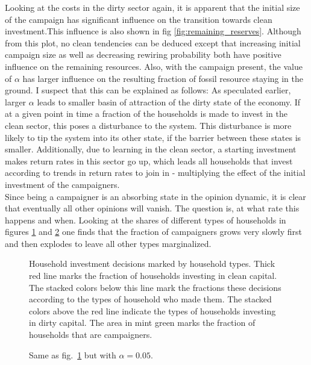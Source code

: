 Looking at the costs in the dirty sector again, it is apparent that the initial size of the campaign has significant influence on the transition towards clean investment.This influence is also shown in fig \ref{fig:remaining_reserves}. Although from this plot, no clean tendencies can be deduced except that increasing initial campaign size as well as decreasing rewiring probability both have positive influence on the remaining resources.
Also, with the campaign present, the value of $\alpha$ has larger influence on the resulting fraction of fossil resource staying in the ground. I suspect that this can be explained as follows: As speculated earlier, larger $\alpha$ leads to smaller basin of attraction of the dirty state of the economy. If at a given point in time a fraction of the households is made to invest in the clean sector, this poses a disturbance to the system. This disturbance is more likely to tip the system into its other state, if the barrier between these states is smaller. Additionally, due to learning in the clean sector, a starting investment makes return rates in this sector go up, which leads all households that invest according to trends in return rates to join in - multiplying the effect of the initial investment of the campaigners.\\
Since being a campaigner is an absorbing state in the opinion dynamic, it is clear that eventually all other opinions will vanish. The question is, at what rate this happens and when. Looking at the shares of different types of households in figures \ref{fig:campaign_decisions0o1} and \ref{fig:campaign_decisions0o05} one finds that the fraction of campaigners grows very slowly first and then explodes to leave all other types marginalized.\\
\begin{figure}[t]
	\centering
	\caption{Household investment decisions marked by household types. Thick red line marks the fraction of households investing in clean capital. The stacked colors below this line mark the fractions these decisions according to the types of household who made them. The stacked colors above the red line indicate the types of households investing in dirty capital. The area in mint green marks the fraction of households that are campaigners.}
	\label{fig:campaign_decisions0o1}
\end{figure}
\begin{figure}[t]
	\centering
	\caption{Same as fig.~\ref{fig:campaign_decisions0o1} but with $\alpha = 0.05$.}
	\label{fig:campaign_decisions0o05}
\end{figure}


